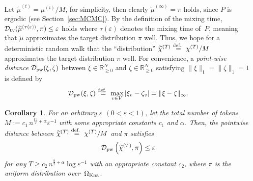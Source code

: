 \documentclass[letter, 11pt]{article}
\newcommand{\defeq}{\stackrel{\mbox{\scriptsize{\normalfont\rmfamily def. }}}{=}}
\newcommand{\1}{\mbox{1}\hspace{-0.25em}\mbox{l}}
\newcommand{\dpw}{{\cal D}_{\rm pw}}
\newtheorem{corollary}[theorem]{Corollary}
\begin{document}
 Let  $\widetilde{\mu}^{(t)} =  \mu^{(t)}/M$, for simplicity, 
  then clearly $\widetilde{\mu}^{(\infty)} = \pi$ holds, 
  since $P$ is ergodic (see Section~\ref{sec:MCMC}).  
 By the definition of the mixing time, 
  ${\cal D}_{\rm tv}(\widetilde{\mu}^{(\tau(\varepsilon))},\pi) \leq \varepsilon$ holds 
 where $\tau(\varepsilon)$ denotes the mixing time of~$P$, 
 meaning that $\widetilde{\mu}$ approximates the target distribution $\pi$ well. 
 Thus, we hope for a deterministic random walk 
  that the ``distribution'' 
  $\widetilde{\chi}^{(T)} \defeq \chi^{(T)}/M$ 
  approximates the target distribution $\pi$ well. 
For convenience, 
  a {\em point-wise distance} $\dpw(\xi,\zeta)$ 
   between $\xi \in \mathbb{R}_{\geq 0}^{N}$ and $\zeta \in \mathbb{R}_{\geq 0}^{N}$ satisfying $\|\xi\|_1 = \|\zeta\|_1 = 1$ 
  is defined by 
\begin{eqnarray}
 \dpw(\xi,\zeta) 
\defeq \max_{v \in V} |\xi_v - \zeta_v|
= \|\xi - \zeta \|_{\infty}. 
\end{eqnarray}


\begin{corollary}
 For an arbitrary $\varepsilon$ $(0<\varepsilon<1)$, 
  let the total number of tokens $M := c_1\, n^{\frac{11}{2}+\alpha}\varepsilon ^{-1}$ 
   with some appropriate constants $c_1$ and $\alpha$. 
 Then, 
  the pointwise distance between $\widetilde{\chi}^{(T)} \defeq \chi^{(T)}/M$ and $\pi$ satisfies
\begin{eqnarray}
 \dpw\left(\widetilde{\chi}^{(T)},\pi\right) \leq \varepsilon
\label{eq:knapsack}
\end{eqnarray}
 for any $T \geq c_2\, n^{\frac{9}{2}+\alpha}\log \varepsilon ^{-1}$ 
   with an appropriate constant $c_2$, 
 where $\pi$ is the uniform distribution over~$\Omega_{\rm Kna}$. 
\end{corollary}
\end{document}
